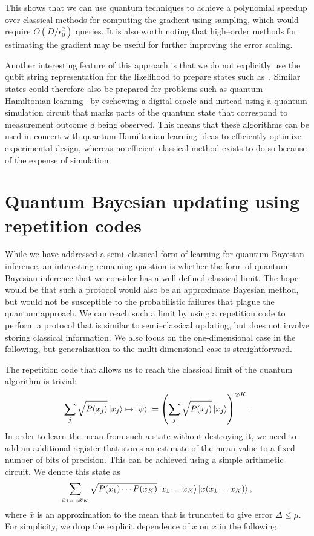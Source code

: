 \documentclass[aps,amsmath,onecolumn,amssymb,notitlepage]{revtex4-1}
\begin{document}
This shows that we can use quantum techniques to achieve a polynomial speedup over classical methods for computing the gradient using sampling, which would require $O(D/\epsilon_0^2)$ queries.  It is also worth noting that high--order methods for estimating the gradient may be useful for further improving the error scaling.

Another interesting feature of this approach is that we do not explicitly use the qubit string representation for the likelihood to prepare states such as~.   Similar states could therefore also be prepared for problems such as quantum Hamiltonian learning~\cite{WGF+14} by eschewing a digital oracle and instead using a quantum simulation circuit that marks parts of the quantum state that correspond to measurement outcome $d$ being observed.  This means that these algorithms can be used in concert with quantum Hamiltonian learning ideas to efficiently optimize experimental design, whereas no efficient classical method exists to do so because of the expense of simulation.

\section{Quantum Bayesian updating using repetition codes}
While we have addressed a semi--classical form of learning for quantum Bayesian inference, an interesting remaining question is whether the form of quantum
Bayesian inference that we consider has a well defined classical limit.  The hope would be that such a protocol would also be an approximate Bayesian method, but would not be susceptible to the probabilistic failures that plague the quantum approach.  We can reach such a limit by using a repetition code to perform a protocol that is similar to semi--classical updating, but does not involve storing classical information.  We also focus on the one-dimensional case in the following, but generalization to the multi-dimensional case is straightforward.

The repetition code that allows us to reach the classical limit of the quantum algorithm is trivial:
\begin{equation}
\sum_{j} \sqrt{P(x_j)} \left|x_j\right\rangle \mapsto \left|\psi\right\rangle:= \left(\sum_j \sqrt{P(x_j)} \left|x_j\right\rangle\right)^{\otimes K}.
\end{equation}
In order to learn the mean from such a state without destroying it, we need to add an additional register that stores an estimate of the mean-value to a fixed number of bits of precision.  This can be achieved using a simple arithmetic circuit.  We denote this state as
\begin{equation}
\sum_{x_1,\ldots,x_K} \sqrt{P(x_1)\cdots P(x_K)} \left|x_1\ldots x_K\right\rangle \left|\bar{x}(x_1\ldots x_K)\right\rangle,
\end{equation}
where $\bar{x}$ is an approximation to the mean that is truncated to give error $\Delta\le \mu$.  For simplicity, we drop the explicit dependence of $\bar{x}$ on $x$ in the following.
\end{document}
